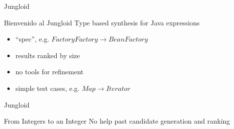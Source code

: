 \begin{frame}{Jungloid}
  \begin{block}{Bienvenido al Jungloid}
    Type based synthesis for Java expressions

    \begin{itemize}
      \item ``spec'', e.g. $FactoryFactory \rightarrow BeanFactory$
      \item results ranked by size
      \item no tools for refinement
      \item simple test cases, e.g. $Map \rightarrow Iterator$
    \end{itemize}
  \end{block}
\end{frame}

\begin{frame}{Jungloid}
  \begin{block}{From Integers to an Integer}
    No help past candidate generation and ranking

    \begin{example}
      
    \end{example}
  \end{block}
\end{frame}
